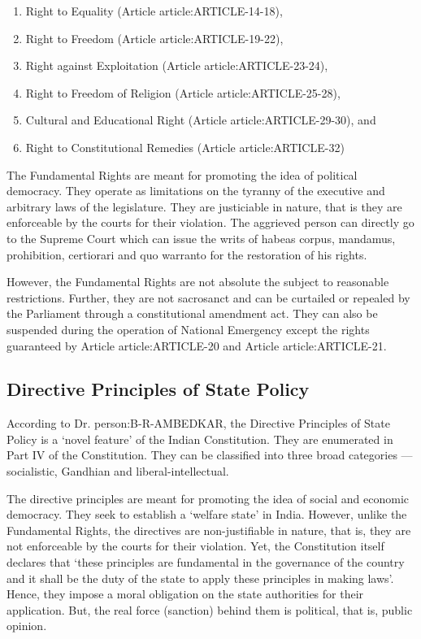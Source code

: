 \begin{multicols}{2}
\renewcommand{\labelenumi}{\textbf{(\alph{enumi})}}
\begin{enumerate}
  \item Right to Equality (Article \gls{article:ARTICLE-14-18}),
  \item Right to Freedom (Article \gls{article:ARTICLE-19-22}),
  \item Right against Exploitation (Article \gls{article:ARTICLE-23-24}),
  \item Right to Freedom of Religion (Article \gls{article:ARTICLE-25-28}),
  \item Cultural and Educational Right (Article \gls{article:ARTICLE-29-30}), and
  \item Right to Constitutional Remedies (Article \gls{article:ARTICLE-32})
\end{enumerate}

The Fundamental Rights are meant for promoting the idea of political democracy. They operate as limitations on the tyranny of the executive and arbitrary laws of the legislature. They are justiciable in nature, that is they are enforceable by the courts for their violation. The aggrieved person can directly go to the Supreme Court which can issue the writs of { habeas corpus}, { mandamus}, prohibition, { certiorari} and { quo warranto} for the restoration of his rights.

However, the Fundamental Rights are not absolute the subject to reasonable restrictions. Further, they are not sacrosanct and can be curtailed or repealed by the Parliament through a constitutional amendment act. They can also be suspended during the operation of National Emergency except the rights guaranteed by Article \gls{article:ARTICLE-20} and Article \gls{article:ARTICLE-21}.

\subsection{Directive Principles of State Policy}

According to Dr. \gls{person:B-R-AMBEDKAR}, the Directive Principles of State Policy is a `novel feature' of the Indian Constitution. They are enumerated in Part IV of the Constitution. They can be classified into three broad categories — socialistic, Gandhian and liberal-intellectual.

The directive principles are meant for promoting the idea of social and economic democracy. They seek to establish a `welfare state' in India. However, unlike the Fundamental Rights, the directives are non-justifiable in nature, that is, they are not enforceable by the courts for their violation. Yet, the Constitution itself declares that `these principles are fundamental in the governance of the country and it shall be the duty of the state to apply these principles in making laws'. Hence, they impose a moral obligation on the state authorities for their application. But, the real force (sanction) behind them is political, that is, public opinion.


\end{multicols}
